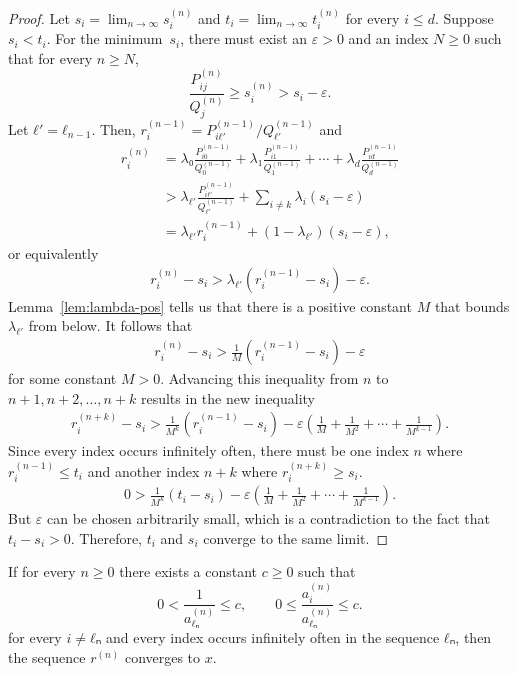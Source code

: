 \begin{proof}
  Let $s_i = \lim_{n → ∞} s_i^{(n)}$
  and $t_i = \lim_{n → ∞} t_i^{(n)}$ for every $i ≤ d$.
  Suppose $s_i < t_i$.
  For the minimum~$s_i$, there must exist an $ε > 0$ and an index $N ≥ 0$ such
  that for every $n ≥ N$,
  \[
    \frac{P_{ij}^{(n)}}{Q_j^{(n)}} ≥ s_i^{(n)} > s_i - ε.
  \]
  Let $ℓ' = ℓ_{n-1}$.
  Then, $r_i^{(n-1)} = P_{iℓ'}^{(n-1)}/Q_{ℓ'}^{(n-1)}$ and
  \begin{align*}
    r_i^{(n)}
    & = λ₀ \frac{P_{i0}^{(n-1)}}{Q_0^{(n-1)}} + λ₁ \frac{P_{i1}^{(n-1)}}{Q_1^{(n-1)}} + ⋯ + λ_d \frac{P_{id}^{(n-1)}}{Q_d^{(n-1)}} \\
    & > \lambda_{ℓ'} \frac{P_{iℓ'}^{(n-1)}}{Q_{ℓ'}^{(n-1)}} + \sum_{i ≠ k} λ_i (s_i - ε) \\
    & = \lambda_{ℓ'} r_i^{(n-1)} + (1 - λ_{ℓ'}) (s_i - ε),
  \end{align*}
  or equivalently
  \begin{align*}
    r_i^{(n)} - s_i > λ_{ℓ'} \left( r_i^{(n-1)} - s_i \right) - ε.
  \end{align*}
  Lemma~\ref{lem:lambda-pos} tells us that there is a positive constant $M$
  that bounds $λ_{ℓ'}$ from below.
  It follows that
  \begin{align*}
    r_i^{(n)} - s_i > \frac{1}{M} \left( r_i^{(n-1)} - s_i \right) - ε
  \end{align*}
  for some constant $M > 0$.
  Advancing this inequality from $n$ to $n+1, n+2, …, n+k$ results in the new
  inequality
  \begin{align*}
    r_i^{(n+k)} - s_i > \frac{1}{M^k} \left( r_i^{(n-1)} - s_i \right) - ε\left( \frac{1}{M} + \frac{1}{M^2} + ⋯ + \frac{1}{M^{k-1}} \right).
  \end{align*}
  Since every index occurs infinitely often,
  there must be one index $n$ where $r_i^{(n-1)} ≤ t_i$
  and another index $n+k$ where $r_i^{(n+k)} ≥ s_i$.
  \begin{align*}
    0 > \frac{1}{M^k} \left( t_i - s_i \right) - ε\left( \frac{1}{M} + \frac{1}{M^2} + ⋯ + \frac{1}{M^{k-1}} \right).
  \end{align*}
  But $ε$ can be chosen arbitrarily small,
  which is a contradiction to the fact that $t_i - s_i > 0$.
  Therefore, $t_i$ and $s_i$ converge to the same limit.
\end{proof}

\begin{theorem}
  \label{thm:mdcf-conv}
  If for every $n ≥ 0$ there exists a constant $c ≥ 0$ such that
  \[
    0 < \frac{1}{a^{(n)}_{ℓₙ}} ≤ c, \qquad 0 ≤ \frac{a^{(n)}_i}{a^{(n)}_{ℓₙ}} ≤ c.
  \]
  for every $i ≠ ℓₙ$ and every index occurs infinitely often in the sequence $ℓₙ$,
  then the sequence $r^{(n)}$ converges to $x$.
\end{theorem}

